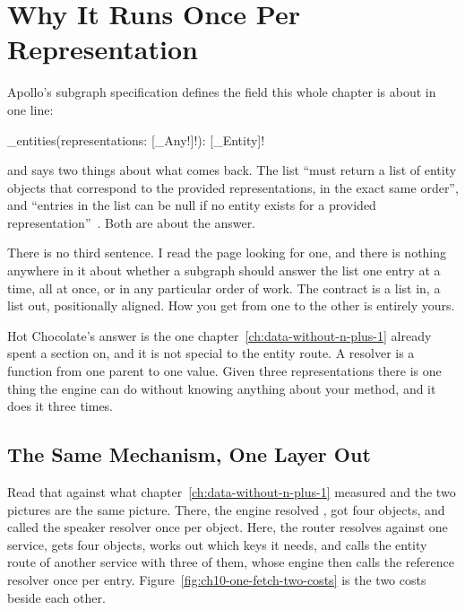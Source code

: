 \section{Why It Runs Once Per Representation}
\label{sec:ch10-why-it-runs-once-per-representation}

%
Apollo's subgraph specification defines the field this whole chapter is about
in one line:

\begin{graphqlsdl}
_entities(representations: [_Any!]!): [_Entity]!
\end{graphqlsdl}

%
and says two things about what comes back. The list
\enquote{must return a list of entity objects that correspond to the provided
representations, in the exact same order}, and
\enquote{entries in the list can be null if no entity exists for a provided
representation}~\autocite{apollosubgraphspec}. Both are about the answer.

%
There is no third sentence. I read the page looking for one, and there is
nothing anywhere in it about whether a subgraph should answer the list one entry
at a time, all at once, or in any particular order of work. The contract is a
list in, a list out, positionally aligned. How you get from one to the other is
entirely yours.

%
Hot Chocolate's answer is the one chapter~\ref{ch:data-without-n-plus-1}
already spent a section on, and it is not special to the entity route. A
resolver is a function from one parent to one value. Given three
representations there is one thing the engine can do without knowing anything
about your method, and it does it three times.

\subsection{The Same Mechanism, One Layer Out}

%
Read that against what chapter~\ref{ch:data-without-n-plus-1} measured and the
two pictures are the same picture. There, the engine resolved ,
got four objects, and called the speaker resolver once per object. Here, the
router resolves  against one service, gets four objects, works
out which keys it needs, and calls the entity route of another service with
three of them, whose engine then calls the reference resolver once per entry.
Figure~\ref{fig:ch10-one-fetch-two-costs} is the two costs beside each other.

